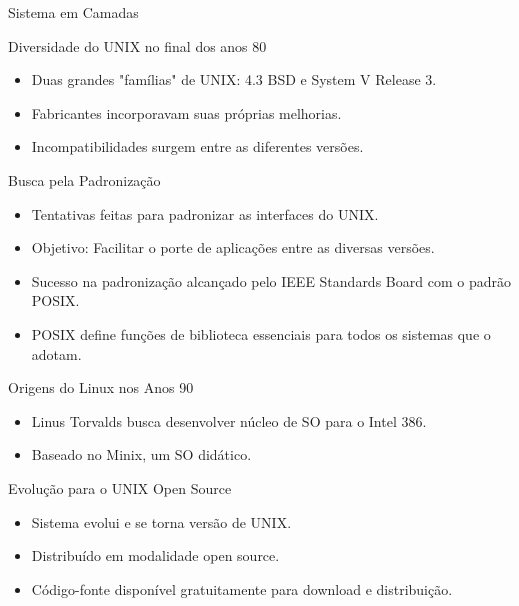 \documentclass{beamer}
\begin{document}
\begin{frame}{Sistema em Camadas}
\begin{frame}{Diversidade do UNIX no final dos anos 80}
    \begin{itemize}
        \item Duas grandes "famílias" de UNIX: 4.3 BSD e System V Release 3.
        \item Fabricantes incorporavam suas próprias melhorias.
        \item Incompatibilidades surgem entre as diferentes versões.
    \end{itemize}
\end{frame}



\begin{frame}{Busca pela Padronização}
    \begin{itemize}
        \item Tentativas feitas para padronizar as interfaces do UNIX.
        \item Objetivo: Facilitar o porte de aplicações entre as diversas versões.
        \item Sucesso na padronização alcançado pelo IEEE Standards Board com o padrão POSIX.
        \item POSIX define funções de biblioteca essenciais para todos os sistemas que o adotam.
    \end{itemize}
\end{frame}
\begin{frame}{Origens do Linux nos Anos 90}
    \begin{itemize}
        \item Linus Torvalds busca desenvolver núcleo de SO para o Intel 386.
        \item Baseado no Minix, um SO didático.
    \end{itemize}
\end{frame}

\begin{frame}{Evolução para o UNIX Open Source}
    \begin{itemize}
        \item Sistema evolui e se torna versão de UNIX.
        \item Distribuído em modalidade open source.
        \item Código-fonte disponível gratuitamente para download e distribuição.
    \end{itemize}
\end{frame}


\end{frame}
\end{document}
